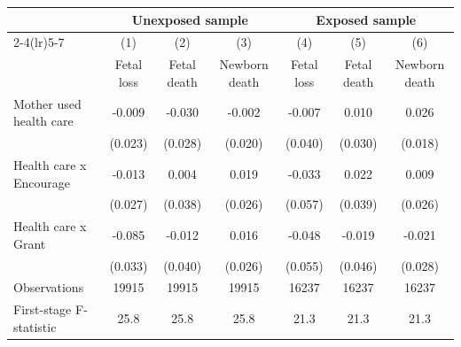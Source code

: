 \begin{tabular*}{\hsize}{@{\hskip\tabcolsep\extracolsep\fill}l*{6}{c}}
\toprule
                    &\multicolumn{3}{c}{Unexposed sample}  &\multicolumn{3}{c}{Exposed sample}    \\\cmidrule(lr){2-4}\cmidrule(lr){5-7}
                    &\multicolumn{1}{c}{(1)}&\multicolumn{1}{c}{(2)}&\multicolumn{1}{c}{(3)}&\multicolumn{1}{c}{(4)}&\multicolumn{1}{c}{(5)}&\multicolumn{1}{c}{(6)}\\
                    &\multicolumn{1}{c}{Fetal loss}&\multicolumn{1}{c}{Fetal death}&\multicolumn{1}{c}{Newborn death}&\multicolumn{1}{c}{Fetal loss}&\multicolumn{1}{c}{Fetal death}&\multicolumn{1}{c}{Newborn death}\\
\midrule
Mother used health care&      -0.009&      -0.030&      -0.002&      -0.007&       0.010&       0.026\\
                    &     (0.023)&     (0.028)&     (0.020)&     (0.040)&     (0.030)&     (0.018)\\
\addlinespace
Health care x Encourage&      -0.013&       0.004&       0.019&      -0.033&       0.022&       0.009\\
                    &     (0.027)&     (0.038)&     (0.026)&     (0.057)&     (0.039)&     (0.026)\\
\addlinespace
Health care x Grant &      -0.085&      -0.012&       0.016&      -0.048&      -0.019&      -0.021\\
                    &     (0.033)&     (0.040)&     (0.026)&     (0.055)&     (0.046)&     (0.028)\\
\midrule
Observations        &       19915&       19915&       19915&       16237&       16237&       16237\\
First-stage F-statistic&        25.8&        25.8&        25.8&        21.3&        21.3&        21.3\\
\bottomrule
\end{tabular*}
